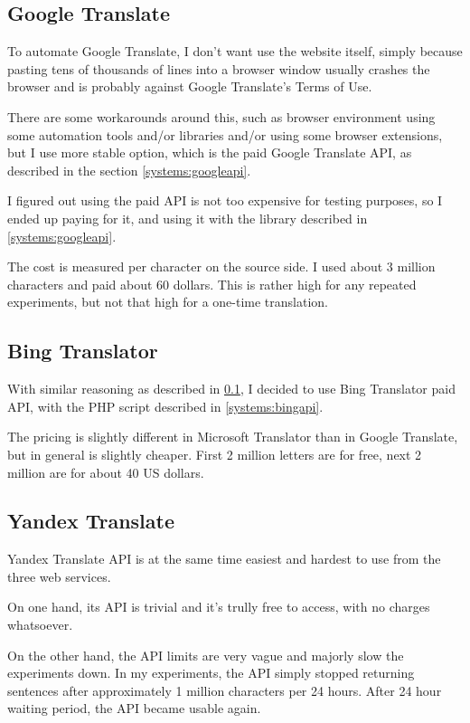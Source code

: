 \subsection{Google Translate}
\label{experiments:google}

To automate Google Translate, I don't want use the website itself, simply because pasting tens of thousands of lines into a browser window usually crashes the browser and is probably against Google Translate's Terms of Use.

There are some workarounds around this, such as  browser environment using some automation tools and/or libraries and/or using some browser extensions, but I use more stable option, which is the paid Google Translate API, as described in the section \ref{systems:googleapi}.

I figured out using the paid API is not too expensive for testing purposes, so I ended up paying for it, and using it with the library described in \ref{systems:googleapi}.

The cost is measured per character on the source side. I used about 3 million characters and paid about 60 dollars. This is rather high for any repeated experiments, but not that high for a one-time translation.

\subsection{Bing Translator}
\label{experiments:bing}
With similar reasoning as described in \ref{experiments:google}, I decided to use Bing Translator paid API, with the PHP script described in \ref{systems:bingapi}.

The pricing is slightly different in Microsoft Translator than in Google Translate, but in general is slightly cheaper. First 2 million letters are for free, next 2 million are for about 40 US dollars.

\subsection{Yandex Translate}
\label{experiments:yandex}
Yandex Translate API is at the same time easiest and hardest to use from the three web services.

On one hand, its API is trivial and it's trully free to access, with no charges whatsoever.

On the other hand, the API limits are very vague and majorly slow the experiments down. In my experiments, the API simply stopped returning sentences after approximately 1 million characters per 24 hours. After 24 hour waiting period, the API became usable again.

